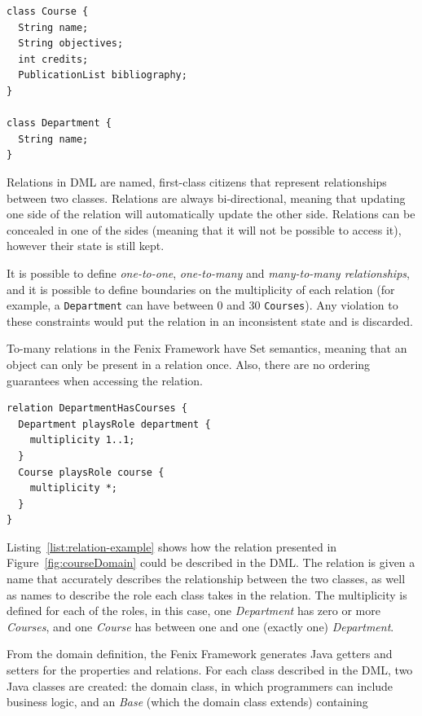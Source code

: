 \begin{lstlisting}[caption={DML for the {\it Course} and {\it
      Department} classes},
  label={list:class-example}, float]
class Course {
  String name;
  String objectives;
  int credits;
  PublicationList bibliography;
}

class Department {
  String name;
}
\end{lstlisting}

Relations in DML are named, first-class citizens that represent
relationships between two classes. Relations are always bi-directional,
meaning that updating one side of the relation will automatically
update the other side. Relations can be concealed in one of the sides
(meaning that it will not be possible to access it), however their
state is still kept.

It is possible to define {\it one-to-one}, {\it one-to-many} and {\it
  many-to-many relationships}, and it is possible to define boundaries
on the multiplicity of each relation (for example, a
\texttt{Department} can have between 0 and 30 \texttt{Courses}). Any
violation to these constraints would put the relation in an
inconsistent state and is discarded.

To-many relations in the Fenix Framework have Set semantics, meaning
that an object can only be present in a relation once. Also, there are
no ordering guarantees when accessing the relation.

\begin{lstlisting}[caption={DML for the relation between {\it Course}
    and {\it Department}},label={list:relation-example}]
relation DepartmentHasCourses {
  Department playsRole department {
    multiplicity 1..1;
  }
  Course playsRole course {
    multiplicity *;
  }
}
\end{lstlisting}

Listing~\ref{list:relation-example} shows how the relation presented
in Figure~\ref{fig:courseDomain} could be described in the DML. The
relation is given a name that accurately describes the relationship
between the two classes, as well as names to describe the role each
class takes in the relation. The multiplicity is defined for each of
the roles, in this case, one {\it Department} has zero or more {\it
  Courses}, and one {\it Course} has between one and one (exactly one)
{\it Department}.


From the domain definition, the Fenix Framework generates Java getters
and setters for the properties and relations. For each class described
in the DML, two Java classes are created: the domain class, in which
programmers can include business logic, and an {\it Base} (which the
domain class extends) containing 

